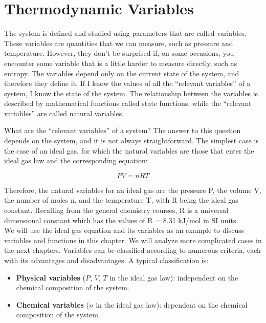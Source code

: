 \documentclass[
  9pt,
]{extbook}
\providecommand{\tightlist}{%
  \setlength{\itemsep}{0pt}\setlength{\parskip}{0pt}}
\theoremstyle{definition}
\theoremstyle{definition}
\theoremstyle{definition}
\theoremstyle{remark}
\begin{document}
\hypertarget{thermodynamic-variables}{%
\section{Thermodynamic Variables}\label{thermodynamic-variables}}

The system is defined and studied using parameters that are called variables. These variables are quantities that we can measure, such as pressure and temperature. However, they don't be surprised if, on some occasions, you encounter some variable that is a little harder to measure directly, such as entropy. The variables depend only on the current state of the system, and therefore they define it. If I know the values of all the ``relevant variables'' of a system, I know the state of the system. The relationship between the variables is described by mathematical functions called state functions, while the ``relevant variables'' are called natural variables.

What are the ``relevant variables'' of a system? The answer to this question depends on the system, and it is not always straightforward. The simplest case is the case of an ideal gas, for which the natural variables are those that enter the ideal gas law and the corresponding equation:

\begin{equation}
  PV=nRT       
  \label{eq:idealgaslaworiginal}
\end{equation}

Therefore, the natural variables for an ideal gas are the pressure P, the volume V, the number of moles n, and the temperature T, with R being the ideal gas constant. Recalling from the general chemistry courses, R is a universal dimensional constant which has the values of R = 8.31 kJ/mol in SI units.\\
We will use the ideal gas equation and its variables as an example to discuss variables and functions in this chapter. We will analyze more complicated cases in the next chapters.
Variables can be classified according to numerous criteria, each with its advantages and disadvantages. A typical classification is:

\begin{itemize}
\tightlist
\item
  \textbf{Physical variables} (\(P\), \(V\), \(T\) in the ideal gas law): independent on the chemical composition of the system.
\item
  \textbf{Chemical variables} (\(n\) in the ideal gas law): dependent on the chemical composition of the system.
\end{itemize}
\end{document}

